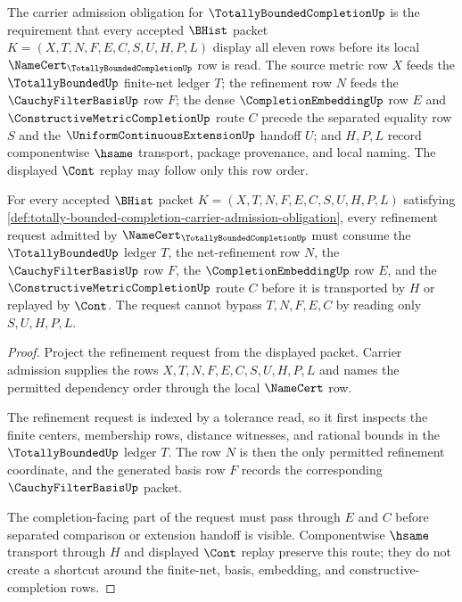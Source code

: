 \begin{definition}
\label{def:totally-bounded-completion-carrier-admission-obligation}
The carrier admission obligation for $\TotallyBoundedCompletionUp$ is the requirement that every accepted $\BHist$ packet $K=(X,T,N,F,E,C,S,U,H,P,L)$ display all eleven rows before its local $\NameCert_{\TotallyBoundedCompletionUp}$ row is read. The source metric row $X$ feeds the $\TotallyBoundedUp$ finite-net ledger $T$; the refinement row $N$ feeds the $\CauchyFilterBasisUp$ row $F$; the dense $\CompletionEmbeddingUp$ row $E$ and $\ConstructiveMetricCompletionUp$ route $C$ precede the separated equality row $S$ and the $\UniformContinuousExtensionUp$ handoff $U$; and $H,P,L$ record componentwise $\hsame$ transport, package provenance, and local naming. The displayed $\Cont$ replay may follow only this row order.
\end{definition}

\begin{theorem}
\label{thm:totally-bounded-completion-refinement-ledger-obligation}
For every accepted $\BHist$ packet $K=(X,T,N,F,E,C,S,U,H,P,L)$ satisfying \autoref{def:totally-bounded-completion-carrier-admission-obligation}, every refinement request admitted by $\NameCert_{\TotallyBoundedCompletionUp}$ must consume the $\TotallyBoundedUp$ ledger $T$, the net-refinement row $N$, the $\CauchyFilterBasisUp$ row $F$, the $\CompletionEmbeddingUp$ row $E$, and the $\ConstructiveMetricCompletionUp$ route $C$ before it is transported by $H$ or replayed by $\Cont$. The request cannot bypass $T,N,F,E,C$ by reading only $S,U,H,P,L$.
\end{theorem}
\begin{proof}
Project the refinement request from the displayed packet. Carrier admission supplies the rows $X,T,N,F,E,C,S,U,H,P,L$ and names the permitted dependency order through the local $\NameCert$ row.

The refinement request is indexed by a tolerance read, so it first inspects the finite centers, membership rows, distance witnesses, and rational bounds in the $\TotallyBoundedUp$ ledger $T$. The row $N$ is then the only permitted refinement coordinate, and the generated basis row $F$ records the corresponding $\CauchyFilterBasisUp$ packet.

The completion-facing part of the request must pass through $E$ and $C$ before separated comparison or extension handoff is visible. Componentwise $\hsame$ transport through $H$ and displayed $\Cont$ replay preserve this route; they do not create a shortcut around the finite-net, basis, embedding, and constructive-completion rows.
\end{proof}

